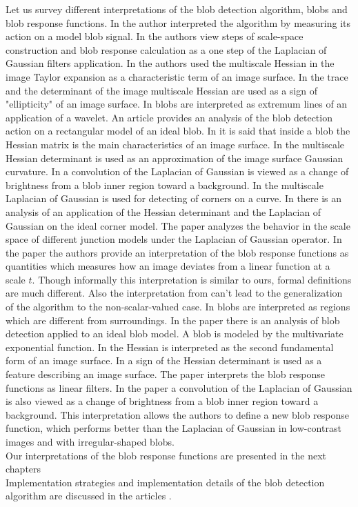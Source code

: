 \documentclass[twocolumn]{svjour3}          %
\begin{document}
Let us survey different interpretations of the blob detection algorithm, blobs and blob response functions. In \cite{blob} the author interpreted the algorithm by measuring its action on a model blob signal. In \cite{GenLapl, GenLaplNucl} the authors view steps of scale-space construction and blob response calculation as a one step of the Laplacian of Gaussian filters application. In \cite{VesselEnh} the authors used the multiscale Hessian in the image Taylor expansion as a characteristic term of an image surface. In \cite{CHEF} the trace and the determinant of the image multiscale Hessian are used as a sign of "ellipticity" of an image surface. In \cite{WaveMax} blobs are interpreted as extremum lines of an application of a wavelet. An article \cite{RectBlobs} provides an analysis of the blob detection action on a rectangular model of an ideal blob. In \cite{ColorBlob} it is said that inside a blob the Hessian matrix is the main characteristics of an image surface. In \cite{BlobCurv1} the multiscale Hessian determinant is used as an approximation of the image surface Gaussian curvature. In \cite{ColorBlob2} a convolution of the Laplacian of Gaussian is viewed as a change of brightness from a blob inner region toward a background. In \cite{LaplCurvCorn} the multiscale Laplacian of Gaussian is used for detecting of corners on a curve. In \cite{CornVertDet} there is an analysis of an application of the Hessian determinant and the Laplacian of Gaussian on the ideal corner model. The paper \cite{JuctionBlob} analyzes the behavior in the scale space of different junction models under the Laplacian of Gaussian operator. In the paper \cite{LinearBlob} the authors provide an interpretation of the blob response functions as quantities which measures how an image deviates from a linear function at a scale $t$. Though informally this interpretation is similar to ours, formal definitions are much different. Also the interpretation from \cite{LinearBlob} can't lead to the generalization of the algorithm to the non-scalar-valued case. In \cite{PhysicalBlob} blobs are interpreted as regions which are different from surroundings. In the paper \cite{DetHessExpMod} there is an analysis of blob detection applied to an ideal blob model. A blob is modeled by the multivariate exponential function. In \cite{BlobCurv2} the Hessian is interpreted as the second fundamental form of an image surface. In \cite{AtomicBlob} a sign of the Hessian determinant is used as a feature describing an image surface. The paper \cite{BrainMR} interprets the blob response functions as linear filters. In the paper \cite{LoGL0} a convolution of the Laplacian of Gaussian is also viewed as a change of brightness from a blob inner region toward a background. This interpretation allows the authors to define a new blob response function, which performs better than the Laplacian of Gaussian in low-contrast images and with irregular-shaped blobs.
\\
Our interpretations of the blob response functions are presented in the next chapters
\\
Implementation strategies and implementation details of the blob detection algorithm are discussed in the articles \cite{SIFT1, SIFT2, SURF, SpeedSIFT, SIFTImpl}.
\end{document}
